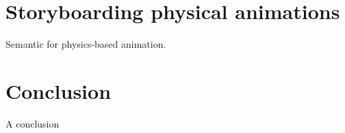 \documentclass[11pt, oneside, a4paper]{memoir}
\begin{document}
\chapter{Storyboarding physical animations}
\label{chap:fluidstoryboard}
Semantic for physics-based animation.

\chapter{Conclusion}
\label{chap:conclusion}
A conclusion



\backmatter

\printbibliography

\listoffigures

\listofalgorithms
 
\listoftables
\end{document}
